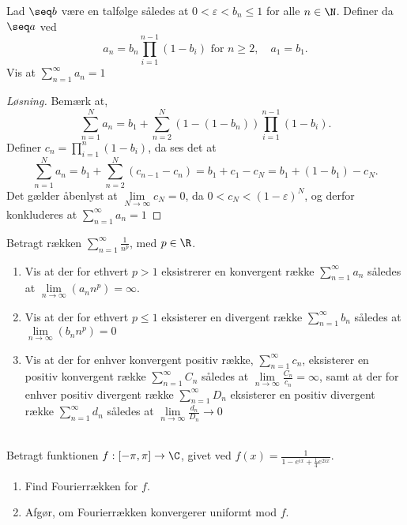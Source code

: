 \begin{opg}
Lad $ \seq b $ være en talfølge således at $ 0<\varepsilon<b_n\leq 1 $ for alle $ n\in\N $. Definer da $ \seq a $ ved \begin{equation*}
a_n=b_n\prod_{i=1}^{n-1}(1-b_i)\text{ for }n\geq 2,\quad a_1=b_1.
\end{equation*}
Vis at $ \sum_{n=1}^{\infty}a_n=1 $
\end{opg}
\begin{proof}[Løsning]
	Bemærk at, \begin{equation}
	\sum_{n=1}^{N}a_n=b_1+\sum_{n=2}^{N}(1-(1-b_n))\prod_{i=1}^{n-1}(1-b_i).
	\end{equation}
	Definer $ c_n=\prod_{i=1}^{n}(1-b_i) $, da ses det at\begin{equation}
	\sum_{n=1}^{N}a_n=b_1+\sum_{n=2}^{N}(c_{n-1}-c_n)=b_1+c_1-c_N=b_1+(1-b_1)-c_N.
	\end{equation}
	Det gælder åbenlyst at $ \lim\limits_{N\to\infty}c_N=0 $, da $ 0<c_N<(1-\varepsilon)^N $, og derfor konkluderes at $ \sum_{n=1}^{\infty}a_n=1 $
\end{proof}

\begin{opg}
	Betragt rækken $ \sum_{n=1}^{\infty}\frac{1}{n^p} $, med $ p\in\R $.
	\begin{enumerate}
		\item  Vis at der for ethvert $ p>1 $ eksistrerer en konvergent række $ \sum_{n=1}^{\infty}a_n $ således at $ \lim\limits_{n\to\infty}(a_n n^p)=\infty $.
		\item Vis at der for ethvert $ p\leq 1 $ eksisterer en divergent række $ \sum_{n=1}^{\infty}b_n $ således at $ \lim\limits_{n\to\infty}(b_n n^p)=0 $
		\item Vis at der for enhver konvergent positiv række, $ \sum_{n=1}^{\infty}c_n $, eksisterer en positiv konvergent række $ \sum_{n=1}^{\infty}C_n $ således at $ \lim\limits_{n\to\infty}\frac{C_n}{c_n}=\infty $, samt at der for enhver positiv divergent række $ \sum_{n=1}^{\infty}D_n $ eksisterer en positiv divergent række $ \sum_{n=1}^{\infty}d_n $ således at $ \lim\limits_{n\to\infty}\frac{d_n}{D_n}\to 0 $
	\end{enumerate}
	
\end{opg}


	\begin{opg}\hfill\\
		Betragt funktionen $ f:[-\pi,\pi]\to\C $, givet ved $f(x)= \frac{1}{1-e^{ix}+\frac{1}{4}e^{2ix}} $. 
		\begin{enumerate}
			\item Find Fourierrækken for $ f $.
			\item Afgør, om Fourierrækken konvergerer uniformt mod $ f $.
		\end{enumerate}
	\end{opg}